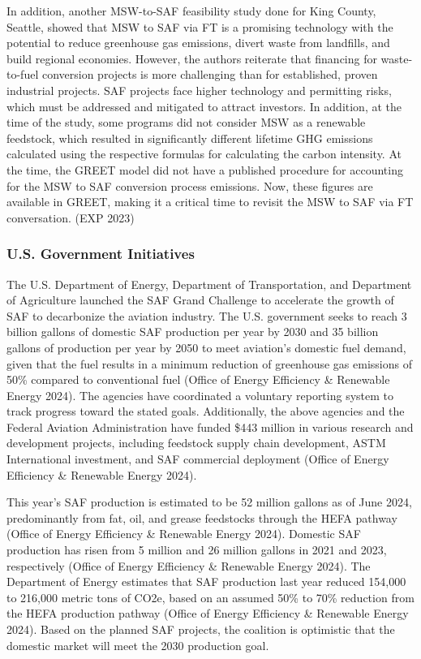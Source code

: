 \documentclass[12pt]{article}
\begin{document}
\begin{Appendix}
In addition, another MSW-to-SAF feasibility study done for King County, Seattle, showed that MSW to SAF via FT is a promising technology with the potential to reduce greenhouse gas emissions, divert waste from landfills, and build regional economies. However, the authors reiterate that financing for waste-to-fuel conversion projects is more challenging than for established, proven industrial projects. SAF projects face higher technology and permitting risks, which must be addressed and mitigated to attract investors. In addition, at the time of the study, some programs did not consider MSW as a renewable feedstock, which resulted in significantly different lifetime GHG emissions calculated using the respective formulas for calculating the carbon intensity. At the time, the GREET model did not have a published procedure for accounting for the MSW to SAF conversion process emissions. Now, these figures are available in GREET, making it a critical time to revisit the MSW to SAF via FT conversation. (EXP 2023)

\subsubsection{ U.S. Government Initiatives}

The U.S. Department of Energy, Department of Transportation, and Department of Agriculture launched the SAF Grand Challenge to accelerate the growth of SAF to decarbonize the aviation industry. The U.S. government seeks to reach 3 billion gallons of domestic SAF production per year by 2030 and 35 billion gallons of production per year by 2050 to meet aviation’s domestic fuel demand, given that the fuel results in a minimum reduction of greenhouse gas emissions of 50\% compared to conventional fuel (Office of Energy Efficiency \& Renewable Energy 2024). The agencies have coordinated a voluntary reporting system to track progress toward the stated goals. Additionally, the above agencies and the Federal Aviation Administration have funded \$443 million in various research and development projects, including feedstock supply chain development, ASTM International investment, and SAF commercial deployment (Office of Energy Efficiency \& Renewable Energy 2024). 

This year’s SAF production is estimated to be 52 million gallons as of June 2024, predominantly from fat, oil, and grease feedstocks through the HEFA pathway (Office of Energy Efficiency \& Renewable Energy 2024). Domestic SAF production has risen from 5 million and 26 million gallons in 2021 and 2023, respectively (Office of Energy Efficiency \& Renewable Energy 2024). The Department of Energy estimates that SAF production last year reduced 154,000 to 216,000 metric tons of CO2e, based on an assumed 50\% to 70\% reduction from the HEFA production pathway (Office of Energy Efficiency \& Renewable Energy 2024). Based on the planned SAF projects, the coalition is optimistic that the domestic market will meet the 2030 production goal. 


\end{Appendix}
\end{document}
